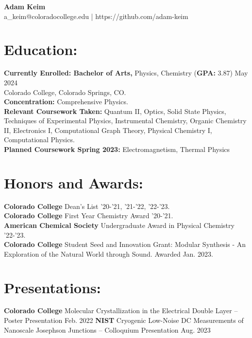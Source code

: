 \documentclass[11pt]{article}
\begin{document}
\pagestyle{empty}

\begingroup  
  \centering
  \LARGE {\bf Adam Keim}\\
a\_keim@coloradocollege.edu | https://github.com/adam-keim \\

\endgroup



\section*{Education:}

{\bf Currently Enrolled: Bachelor of Arts,} Physics, Chemistry ({\bf GPA: } 3.87) \hfill May 2024\\
Colorado College, Colorado Springs, CO. \\
{\bf Concentration:} Comprehensive Physics. \\
{\bf Relevant Coursework Taken:} Quantum II, Optics,  Solid State Physics, Techniques of Experimental Physics, Instrumental Chemistry, Organic Chemistry II, Electronics I, Computational Graph Theory, Physical Chemistry I, Computational Physics.  \\
{\bf Planned Coursework Spring 2023:} Electromagnetism, Thermal Physics

\section*{Honors and Awards:}
{\bf Colorado College} Dean's List '20-'21, '21-'22, '22-'23. \\ 
{\bf Colorado College} First Year Chemistry Award '20-'21. \\
{\bf American Chemical Society} Undergraduate Award in Physical Chemistry '22-'23.\\
{\bf Colorado College} Student Seed and Innovation Grant: Modular Synthesis - An Exploration of the Natural World through Sound. Awarded Jan. 2023.

\section*{Presentations:}

{\bf Colorado College} Molecular Crystallization in the Electrical Double Layer -- Poster Presentation Feb. 2022
{\bf NIST} Cryogenic Low-Noise DC Measurements of Nanoscale Josephson Junctions -- Colloquium Presentation Aug. 2023
\end{document}
